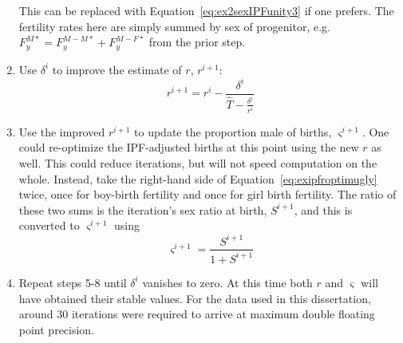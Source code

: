 \begin{enumerate}
  This can be replaced with Equation~\eqref{eq:ex2sexIPFunity3} if one
  prefers. The fertility rates here are simply summed by sex of progenitor, e.g.
  $F_{y}^{M\ast} = F_{y}^{M-M\ast}+F_{y}^{M-F\ast}$ from the prior step.
  \item Use $\delta^i$ to improve the estimate of $r$, $r^{i+1}$:
  \begin{equation}
  r^{i+1} = r^i - \frac{\delta^i}{\widehat{T} - \frac{\delta^i}{r^i}}
  \end{equation}
  \item Use the improved $r^{i+1}$ to update the proportion male of
  births, $\varsigma^{i+1}$. One could re-optimize the IPF-adjusted births at
  this point using the new $r$ as well. This could reduce iterations, but will
  not speed computation on the whole. Instead, take the right-hand side of
  Equation~\eqref{eq:exipfroptimugly} twice, once for boy-birth fertility and
  once for girl birth fertility. The ratio of these two sums is the iteration's
  sex ratio at birth, $S^{i+1}$, and this is converted to $\varsigma^{i+1}$
  using
  \begin{equation}
  \varsigma^{i+1} = \frac{S^{i+1}}{1 + S^{i+1}}
  \end{equation}
  \item Repeat steps 5-8 until $\delta^i$ vanishes to zero. At this time both
  $r$ and $\varsigma$ will have obtained their stable values. For the data used
  in this dissertation, around 30 iterations were required to arrive at maximum
  double floating point precision.
\end{enumerate}


